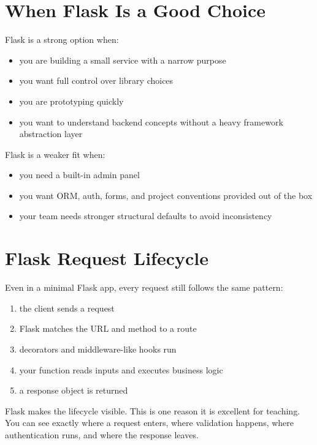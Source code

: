 \documentclass[12pt, a4paper, oneside]{book}
\begin{document}
\section{When Flask Is a Good Choice}

Flask is a strong option when:
\begin{itemize}[leftmargin=2em]
    \item you are building a small service with a narrow purpose
    \item you want full control over library choices
    \item you are prototyping quickly
    \item you want to understand backend concepts without a heavy framework abstraction layer
\end{itemize}

Flask is a weaker fit when:
\begin{itemize}[leftmargin=2em]
    \item you need a built-in admin panel
    \item you want ORM, auth, forms, and project conventions provided out of the box
    \item your team needs stronger structural defaults to avoid inconsistency
\end{itemize}

\section{Flask Request Lifecycle}

Even in a minimal Flask app, every request still follows the same pattern:
\begin{enumerate}[leftmargin=2em]
    \item the client sends a request
    \item Flask matches the URL and method to a route
    \item decorators and middleware-like hooks run
    \item your function reads inputs and executes business logic
    \item a response object is returned
\end{enumerate}

\begin{notebox}
Flask makes the lifecycle visible. This is one reason it is excellent for teaching. You can see exactly where a request enters, where validation happens, where authentication runs, and where the response leaves.
\end{notebox}
\end{document}
